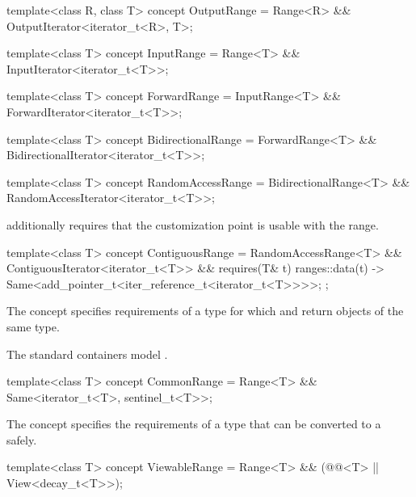 %
%
%
%
%
\begin{itemdecl}
template<class R, class T>
  concept OutputRange =
    Range<R> && OutputIterator<iterator_t<R>, T>;

template<class T>
  concept InputRange =
    Range<T> && InputIterator<iterator_t<T>>;

template<class T>
  concept ForwardRange =
    InputRange<T> && ForwardIterator<iterator_t<T>>;

template<class T>
  concept BidirectionalRange =
    ForwardRange<T> && BidirectionalIterator<iterator_t<T>>;

template<class T>
  concept RandomAccessRange =
    BidirectionalRange<T> && RandomAccessIterator<iterator_t<T>>;
\end{itemdecl}

\pnum
{} additionally requires that
the  customization point
is usable with the range.

%
\begin{itemdecl}
template<class T>
  concept ContiguousRange =
    RandomAccessRange<T> && ContiguousIterator<iterator_t<T>> &&
    requires(T& t) {
      { ranges::data(t) } -> Same<add_pointer_t<iter_reference_t<iterator_t<T>>>>;
    };
\end{itemdecl}

\pnum
The  concept specifies requirements of
a  type for which  and
 return objects of the same type.
\begin{example}
The standard containers model .
\end{example}

%
\begin{itemdecl}
template<class T>
  concept CommonRange =
    Range<T> && Same<iterator_t<T>, sentinel_t<T>>;
\end{itemdecl}

\pnum
The  concept specifies the requirements of a
 type that can be converted to a  safely.

%
\begin{itemdecl}
template<class T>
  concept ViewableRange =
    Range<T> && (@@<T> || View<decay_t<T>>);
\end{itemdecl}

